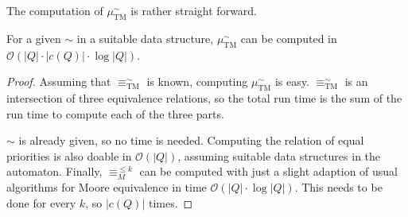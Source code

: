 The computation of $\mu_\text{TM}^\sim$ is rather straight forward. 

\begin{theorem}
	For a given $\sim$ in a suitable data structure, $\mu_\text{TM}^\sim$ can be computed in $\mathcal{O}(|Q| \cdot |c(Q)| \cdot \log |Q|)$.
\end{theorem}

\begin{proof}
	Assuming that $\equiv_\text{TM}^\sim$ is known, computing $\mu_\text{TM}^\sim$ is easy. $\equiv_\text{TM}^\sim$ is an intersection of three equivalence relations, so the total run time is the sum of the run time to compute each of the three parts.
	
	$\sim$ is already given, so no time is needed. Computing the relation of equal priorities is also doable in $\mathcal{O}(|Q|)$, assuming suitable data structures in the automaton. Finally, $\equiv_M^{\leq k}$ can be computed with just a slight adaption of usual algorithms for Moore equivalence in time $\mathcal{O}(|Q| \cdot \log |Q|)$. This needs to be done for every $k$, so $|c(Q)|$ times.
\end{proof}










